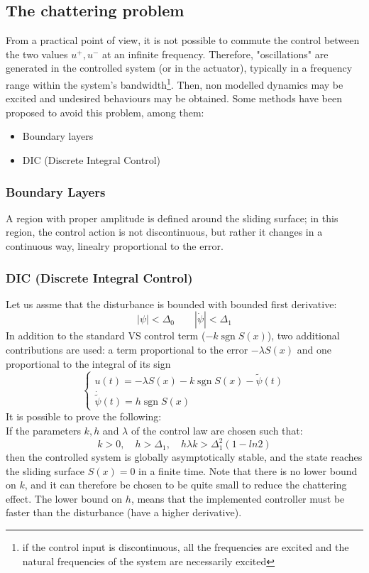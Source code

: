 \documentclass{book}
\DeclareMathOperator{\sgn}{sgn}
\begin{document}
\subsection{The chattering problem}
From a practical point of view, it is not possible to commute the control between the two values $u^+,u^-$ at an infinite frequency. Therefore, "oscillations" are generated in the controlled system (or in the actuator), typically in a frequency range within the system's bandwidth\footnote{if the control input is discontinuous, all the frequencies are excited and the natural frequencies of the system are necessarily excited}. Then, non modelled dynamics may be excited and undesired behaviours may be obtained. Some methods have been proposed to avoid this problem, among them:
\begin{itemize}
    \item Boundary layers
    \item DIC (Discrete Integral Control)
\end{itemize}
\subsubsection{Boundary Layers}
A region with proper amplitude is defined around the sliding surface; in this region, the control action is not discontinuous, but rather it changes in a continuous way, linealry proportional to the error.
\subsubsection{DIC (Discrete Integral Control)}
Let us assme that the disturbance is bounded with bounded first derivative:
\[
    |\psi|<\Delta_0 \qquad |\dot{\psi}|<\Delta_1
\]
In addition to the standard VS control term ($-k \sgn S(x)$), two additional contributions are used: a term proportional to the error $-\lambda S(x)$ and one proportional to the integral of its sign
\[
    \begin{cases}
        u(t) = -\lambda S(x) -k\sgn S(x)-\tilde{\psi}(t)\\
        \dot{\tilde{\psi}} (t) = h \sgn S(x)
    \end{cases}
\]
It is possible to prove the following: \\
If the parameters $k,h$ and $\lambda$ of the control law are chosen such that:
\[
    k>0, \quad h>\Delta_1, \quad h\lambda k > \Delta_1^2(1-ln2)
\]
then the controlled system is globally asymptotically stable, and the state reaches the sliding surface $S(x)=0$ in a finite time.
Note that there is no lower bound on $k$, and it can therefore be chosen to be quite small to reduce the chattering effect. The lower bound on $h$, means that the implemented controller must be faster than the disturbance (have a higher derivative). 
\end{document}
